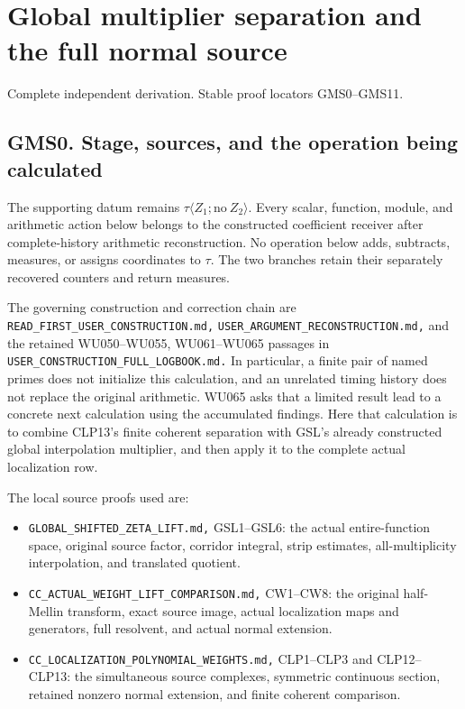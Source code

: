 \section{Global multiplier separation and the full normal
source}\label{global-multiplier-separation-and-the-full-normal-source}

Complete independent derivation. Stable proof locators GMS0--GMS11.

\subsection{GMS0. Stage, sources, and the operation being
calculated}\label{gms0.-stage-sources-and-the-operation-being-calculated}

The supporting datum remains
\(\tau\langle Z_1;\mathrm{no}\ Z_2\rangle\). Every scalar, function,
module, and arithmetic action below belongs to the constructed
coefficient receiver after complete-history arithmetic reconstruction.
No operation below adds, subtracts, measures, or assigns coordinates to
\(\tau\). The two branches retain their separately recovered counters
and return measures.

The governing construction and correction chain are
\nolinkurl{READ_FIRST_USER_CONSTRUCTION.md,}
\nolinkurl{USER_ARGUMENT_RECONSTRUCTION.md,} and the retained
WU050--WU055, WU061--WU065 passages in
\nolinkurl{USER_CONSTRUCTION_FULL_LOGBOOK.md.} In particular, a finite
pair of named primes does not initialize this calculation, and an
unrelated timing history does not replace the original arithmetic. WU065
asks that a limited result lead to a concrete next calculation using the
accumulated findings. Here that calculation is to combine CLP13's finite
coherent separation with GSL's already constructed global interpolation
multiplier, and then apply it to the complete actual localization row.

The local source proofs used are:

\begin{itemize}
\tightlist
\item
  \nolinkurl{GLOBAL_SHIFTED_ZETA_LIFT.md,} GSL1--GSL6: the actual
  entire-function space, original source factor, corridor integral,
  strip estimates, all-multiplicity interpolation, and translated
  quotient.
\item
  \nolinkurl{CC_ACTUAL_WEIGHT_LIFT_COMPARISON.md,} CW1--CW8: the
  original half-Mellin transform, exact source image, actual
  localization maps and generators, full resolvent, and actual normal
  extension.
\item
  \nolinkurl{CC_LOCALIZATION_POLYNOMIAL_WEIGHTS.md,} CLP1--CLP3 and
  CLP12--CLP13: the simultaneous source complexes, symmetric continuous
  section, retained nonzero normal extension, and finite coherent
  comparison.
\end{itemize}

